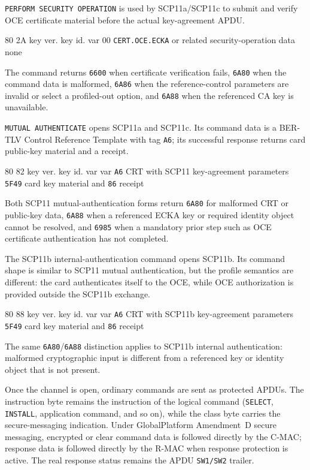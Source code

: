 \texttt{PERFORM SECURITY OPERATION} is used by SCP11a/SCP11c to submit and
verify OCE certificate material before the actual key-agreement APDU.

\apdudesc
{80}
{2A}
{key ver.}
{key id.}
{var}
{00}
{\texttt{CERT.OCE.ECKA} or related security-operation data}
{none}

The command returns \texttt{6600} when certificate verification fails,
\texttt{6A80} when the command data is malformed, \texttt{6A86} when the
reference-control parameters are invalid or select a profiled-out option, and
\texttt{6A88} when the referenced CA key is unavailable.

\texttt{MUTUAL AUTHENTICATE} opens SCP11a and SCP11c. Its command data is a
BER-TLV Control Reference Template with tag \texttt{A6}; its successful
response returns card public-key material and a receipt.

\apdudesc
{80}
{82}
{key ver.}
{key id.}
{var}
{var}
{\texttt{A6} CRT with SCP11 key-agreement parameters}
{\texttt{5F49} card key material and \texttt{86} receipt}

Both SCP11 mutual-authentication forms return \texttt{6A80} for malformed CRT
or public-key data, \texttt{6A88} when a referenced ECKA key or required
identity object cannot be resolved, and \texttt{6985} when a mandatory prior
step such as OCE certificate authentication has not completed.

The SCP11b internal-authentication command opens SCP11b. Its command shape is
similar to SCP11 mutual authentication, but the profile semantics are
different: the card authenticates itself to the OCE, while OCE authorization
is provided outside the SCP11b exchange.

\apdudesc
{80}
{88}
{key ver.}
{key id.}
{var}
{var}
{\texttt{A6} CRT with SCP11b key-agreement parameters}
{\texttt{5F49} card key material and \texttt{86} receipt}

The same \texttt{6A80}/\texttt{6A88} distinction applies to SCP11b internal
authentication: malformed cryptographic input is different from a referenced
key or identity object that is not present.

Once the channel is open, ordinary commands are sent as protected APDUs. The
instruction byte remains the instruction of the logical command
(\texttt{SELECT}, \texttt{INSTALL}, application command, and so on), while the
class byte carries the secure-messaging indication. Under GlobalPlatform
Amendment~D secure messaging, encrypted or clear command data is followed
directly by the C-MAC; response data is followed directly by the R-MAC when
response protection is active. The real response status remains the APDU
\texttt{SW1/SW2} trailer.

